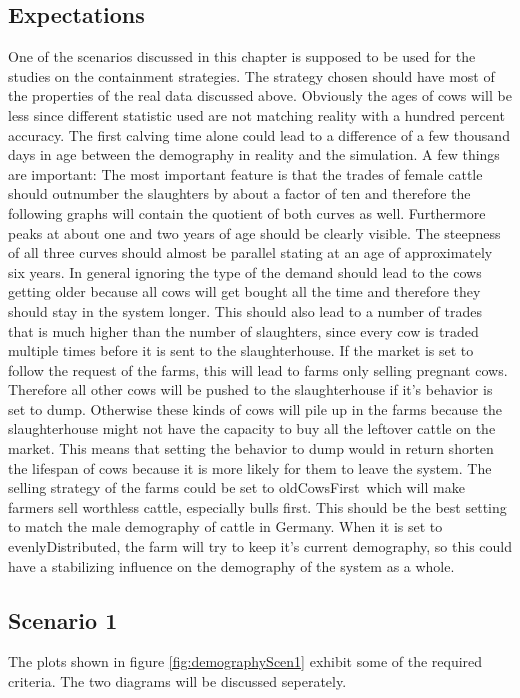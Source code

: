 \subsection{Expectations}
One of the scenarios discussed in this chapter is supposed to be used for the studies on the containment strategies. The strategy chosen should have most of the properties of the real data discussed above. Obviously the ages of cows will be less since different statistic used are not matching reality with a hundred percent accuracy. The first calving time alone could lead to a difference of a few thousand days in age between the demography in reality and the simulation. A few things are important: The most important feature is that the trades of female cattle should outnumber the slaughters by about a factor of ten and therefore the following graphs will contain the quotient of both curves as well. Furthermore peaks at about one and two years of age should be clearly visible. The steepness of all three curves should almost be parallel stating at an age of approximately six years. 
In general ignoring the type of the demand should lead to the cows getting older because all cows will get bought all the time and therefore they should stay in the system longer. This should also lead to a number of trades that is much higher than the number of slaughters, since every cow is traded multiple times before it is sent to the slaughterhouse. If the market is set to follow the request of the farms, this will lead to farms only selling pregnant cows. Therefore all other cows will be pushed to the slaughterhouse if it's behavior is set to \glqq dump\grqq. Otherwise these kinds of cows will pile up in the farms because the slaughterhouse might not have the capacity to buy all the leftover cattle on the market.
This means that setting the behavior to dump would in return shorten the lifespan of cows because it is more likely for them to leave the system. 
The selling strategy of the farms could be set to \glqq oldCowsFirst\grqq\ which will make farmers sell worthless cattle, especially bulls first. This should be the best setting to match the male demography of cattle in Germany. When it is set to \glqq evenlyDistributed\grqq, the farm will try to keep it's current demography, so this could have a stabilizing influence on the demography of the system as a whole.
\subsection{Scenario 1}
The plots shown in figure \ref{fig:demographyScen1} exhibit some of the required criteria. The two diagrams will be discussed seperately.
